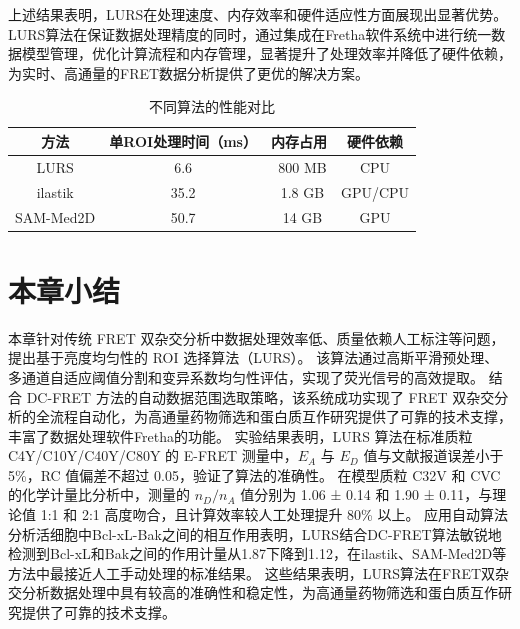 上述结果表明，LURS在处理速度、内存效率和硬件适应性方面展现出显著优势。LURS算法在保证数据处理精度的同时，通过集成在Fretha软件系统中进行统一数据模型管理，优化计算流程和内存管理，显著提升了处理效率并降低了硬件依赖，为实时、高通量的FRET数据分析提供了更优的解决方案。

\begin{table}[htbp]
    \centering
    \caption{不同算法的性能对比}
    \begin{tabular}{cccc}
    \toprule[1.5pt]
    方法 & 单ROI处理时间（ms） & 内存占用 & 硬件依赖 \\
    \midrule
    LURS & 6.6 & ~800 MB & CPU \\
    ilastik & 35.2 & ~1.8 GB & GPU/CPU \\
    SAM-Med2D & 50.7 & ~14 GB & GPU \\
    \bottomrule[1.5pt]
    \end{tabular}
    \label{tab:性能对比}
\end{table}

\section{本章小结}

\ifshowtext
本章针对传统 FRET 双杂交分析中数据处理效率低、质量依赖人工标注等问题，提出基于亮度均匀性的 ROI 选择算法（LURS）。
该算法通过高斯平滑预处理、多通道自适应阈值分割和变异系数均匀性评估，实现了荧光信号的高效提取。
结合 DC-FRET 方法的自动数据范围选取策略，该系统成功实现了 FRET 双杂交分析的全流程自动化，为高通量药物筛选和蛋白质互作研究提供了可靠的技术支撑，丰富了数据处理软件Fretha的功能。
实验结果表明，LURS 算法在标准质粒 C4Y/C10Y/C40Y/C80Y 的 E-FRET 测量中，$E_A$ 与 $E_D$ 值与文献报道误差小于 5\%，RC 值偏差不超过 0.05，验证了算法的准确性。
在模型质粒 C32V 和 CVC 的化学计量比分析中，测量的 $n_D/n_A$ 值分别为 1.06 ± 0.14 和 1.90 ± 0.11，与理论值 1:1 和 2:1 高度吻合，且计算效率较人工处理提升 80\% 以上。
应用自动算法分析活细胞中Bcl-xL-Bak之间的相互作用表明，LURS结合DC-FRET算法敏锐地检测到Bcl-xL和Bak之间的作用计量从1.87下降到1.12，在ilastik、SAM-Med2D等方法中最接近人工手动处理的标准结果。
这些结果表明，LURS算法在FRET双杂交分析数据处理中具有较高的准确性和稳定性，为高通量药物筛选和蛋白质互作研究提供了可靠的技术支撑。
\fi